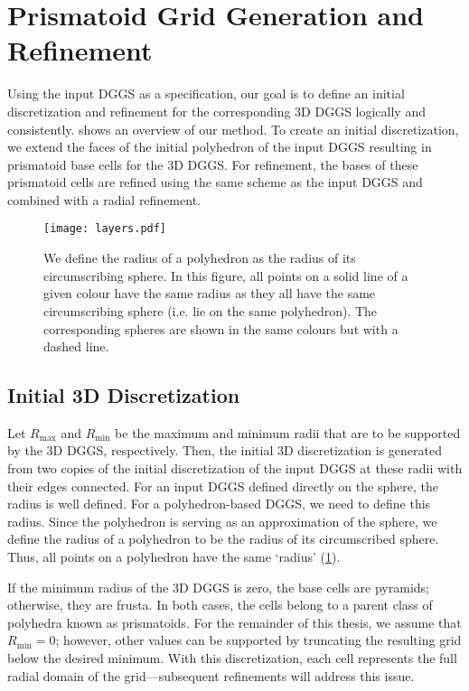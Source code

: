 \section{Prismatoid Grid Generation and Refinement} \label{chap:5:grid}
Using the input DGGS as a specification, our goal is to define an initial discretization and refinement for the corresponding 3D DGGS logically and consistently.
 shows an overview of our method.
To create an initial discretization, we extend the faces of the initial polyhedron of the input DGGS resulting in prismatoid base cells for the 3D DGGS.
For refinement, the bases of these prismatoid cells are refined using the same scheme as the input DGGS and combined with a radial refinement.


\begin{figure}[ht!]
	\centering
	\texttt{[image: layers.pdf]}
	\caption[How the radius of a polyhedron is defined]{
		We define the radius of a polyhedron as the radius of its circumscribing sphere.
		In this figure, all points on a solid line of a given colour have the same radius as they all have the same circumscribing sphere (i.e. lie on the same polyhedron).
		The corresponding spheres are shown in the same colours but with a dashed line.
	}
	\label{fig:layers}
\end{figure}


\subsection{Initial 3D Discretization} \label{chap:5:discretization}
Let $R_\mathrm{max}$ and $R_\mathrm{min}$ be the maximum and minimum radii that are to be supported by the 3D DGGS, respectively.
Then, the initial 3D discretization is generated from two copies of the initial discretization of the input DGGS at these radii with their edges connected.
For an input DGGS defined directly on the sphere, the radius is well defined.
For a polyhedron-based DGGS, we need to define this radius.
Since the polyhedron is serving as an approximation of the sphere, we define the radius of a polyhedron to be the radius of its circumscribed sphere.
Thus, all points on a polyhedron have the same `radius' (\cref{fig:layers}).


If the minimum radius of the 3D DGGS is zero, the base cells are pyramids; otherwise, they are frusta.
In both cases, the cells belong to a parent class of polyhedra known as prismatoids.
For the remainder of this thesis, we assume that $R_\mathrm{min} = 0$; however, other values can be supported by truncating the resulting grid below the desired minimum.
With this discretization, each cell represents the full radial domain of the grid---subsequent refinements will address this issue.


